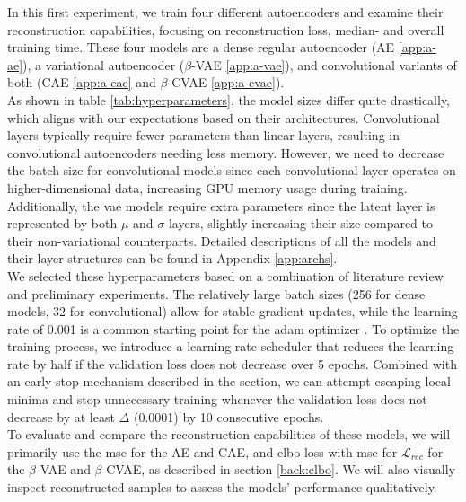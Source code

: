 In this first experiment, we train four different autoencoders and examine their reconstruction capabilities, focusing on reconstruction loss, median- and overall training time. These four models are a dense regular autoencoder (AE \ref{app:a-ae}), a variational autoencoder ($\beta$-VAE \ref{app:a-vae}), and convolutional variants of both (CAE \ref{app:a-cae} and $\beta$-CVAE \ref{app:a-cvae}). \\ 

As shown in table \ref{tab:hyperparameters}, the model sizes differ quite drastically, which aligns with our expectations based on their architectures. Convolutional layers typically require fewer parameters than linear layers, resulting in convolutional autoencoders needing less memory. However, we need to decrease the batch size for convolutional models since each convolutional layer operates on higher-dimensional data, increasing GPU memory usage during training. Additionally, the \acrshort{vae} models require extra parameters since the latent layer is represented by both $\mu$ and $\sigma$ layers, slightly increasing their size compared to their non-variational counterparts. Detailed descriptions of all the models and their layer structures can be found in Appendix \ref{app:archs}. \\

We selected these hyperparameters based on a combination of literature review and preliminary experiments. The relatively large batch sizes (256 for dense models, 32 for convolutional) allow for stable gradient updates, while the learning rate of 0.001 is a common starting point for the \acrshort{adam} optimizer \cite{kingma2017adam}. To optimize the training process, we introduce a learning rate scheduler that reduces the learning rate by half if the validation loss does not decrease over 5 epochs. Combined with an early-stop mechanism described in the section, we can attempt escaping local minima and stop unnecessary training whenever the validation loss does not decrease by at least $\Delta$ (0.0001) by 10 consecutive epochs. \\ 

To evaluate and compare the reconstruction capabilities of these models, we will primarily use the \acrshort{mse} for the AE and CAE, and  \acrshort{elbo} loss with \acrshort{mse} for $\mathcal{L}_{rec}$ for the $\beta$-VAE and $\beta$-CVAE, as described in section \ref{back:elbo}. We will also visually inspect reconstructed samples to assess the models' performance qualitatively.




